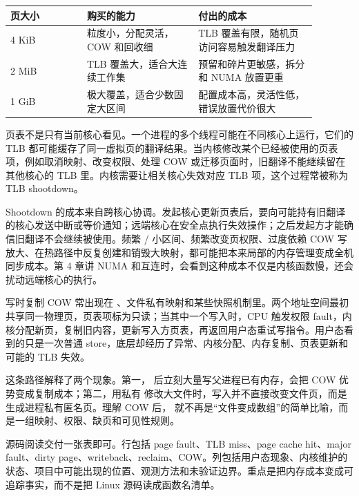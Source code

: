 \begin{center}
\small
\begin{tabular}{@{}p{0.22\linewidth}p{0.32\linewidth}p{0.34\linewidth}@{}}
\toprule
页大小 & 购买的能力 & 付出的成本 \\
\midrule
4 KiB & 粒度小，分配灵活，COW 和回收细 & TLB 覆盖有限，随机页访问容易触发翻译压力 \\
2 MiB & TLB 覆盖大，适合大连续工作集 & 预留和碎片更敏感，拆分和 NUMA 放置更重 \\
1 GiB & 极大覆盖，适合少数固定大区间 & 配置成本高，灵活性低，错误放置代价很大 \\
\bottomrule
\end{tabular}
\end{center}

页表不是只有当前核心看见。一个进程的多个线程可能在不同核心上运行，它们的 TLB 都可能缓存了同一虚拟页的翻译结果。当内核修改某个已经被使用的页表项，例如取消映射、改变权限、处理 COW 或迁移页面时，旧翻译不能继续留在其他核心的 TLB 里。内核需要让相关核心失效对应 TLB 项，这个过程常被称为 TLB shootdown。

Shootdown 的成本来自跨核心协调。发起核心更新页表后，要向可能持有旧翻译的核心发送中断或等价通知；远端核心在安全点执行失效操作；之后发起方才能确信旧翻译不会继续被使用。频繁 / 小区间、频繁改变页权限、过度依赖 COW 写放大、在热路径中反复创建和销毁大映射，都可能把本来局部的内存管理变成全机同步成本。第 4 章讲 NUMA 和互连时，会看到这种成本不仅是内核函数慢，还会扰动远端核心的执行。

写时复制 COW 常出现在 、文件私有映射和某些快照机制里。两个地址空间最初共享同一物理页，页表项标为只读；当其中一个写入时，CPU 触发权限 fault，内核分配新页，复制旧内容，更新写入方页表，再返回用户态重试写指令。用户态看到的只是一次普通 store，底层却经历了异常、内核分配、内存复制、页表更新和可能的 TLB 失效。

这条路径解释了两个现象。第一， 后立刻大量写父进程已有内存，会把 COW 优势变成复制成本；第二，用私有  修改大文件时，写入并不直接改变文件页，而是生成进程私有匿名页。理解 COW 后， 就不再是“文件变成数组”的简单比喻，而是一组映射、权限、缺页和可见性规则。

\begin{sourcereadingbox}
源码阅读交付一张表即可。行包括 page fault、TLB miss、page cache hit、major fault、dirty page、writeback、reclaim、COW。列包括用户态现象、内核维护的状态、项目中可能出现的位置、观测方法和未验证边界。重点是把内存成本变成可追踪事实，而不是把 Linux 源码读成函数名清单。
\end{sourcereadingbox}

